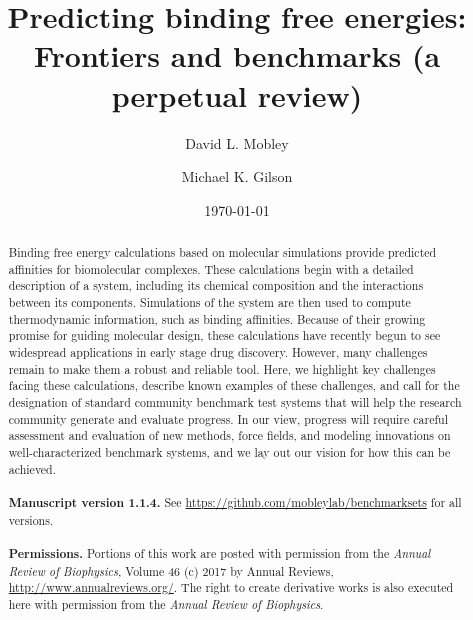 \documentclass[aps,pre,twocolumn,nofootinbib,superscriptaddress,10pt, final,tightenlines]{revtex4-1}
\begin{document}
\title{Predicting binding free energies: Frontiers and benchmarks (a perpetual review)}

\author{David L. Mobley}
\author{Michael K. Gilson}


\date{\today}

\begin{abstract}
Binding free energy calculations based on molecular simulations provide predicted affinities for biomolecular complexes. 
These calculations begin with a detailed description of a system, including its chemical composition and the interactions between its components. 
Simulations of the system are then used to compute thermodynamic information, such as binding affinities. 
Because of their growing promise for guiding molecular design, these calculations have recently begun to see widespread applications in early stage drug discovery.
However, many challenges remain to make them a robust and reliable tool. 
Here, we highlight key challenges facing these calculations, describe known examples of these challenges, and call for the designation of standard community benchmark  test systems that will help the research community generate and evaluate progress.
In our view, progress will require careful assessment and evaluation of new methods, force fields, and modeling innovations on well-characterized benchmark systems, and we lay out our vision for how this can be achieved.
\\
\\
{\bf Manuscript version 1.1.4.} See \url{https://github.com/mobleylab/benchmarksets} for all versions.
\\
\\
{{\bf Permissions.} Portions of this work are posted with permission from the \emph{Annual Review of Biophysics}, Volume 46 (c) 2017 by Annual Reviews, \url{http://www.annualreviews.org/}. 
The right to create derivative works is also executed here with permission from the \emph{Annual Review of Biophysics}.}

\end{abstract}
\end{document}
